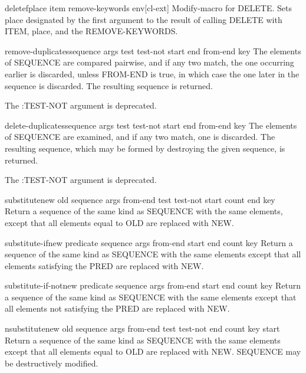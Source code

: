 \documentclass[10pt,english]{book}
\begin{document}
\begin{macro}{deletef}{place item \rest remove-keywords \env env}[cl-ext]
  Modify-macro for DELETE. Sets place designated by the first argument
  to the result of calling DELETE with ITEM, place, and the
  REMOVE-KEYWORDS.
\end{macro}

\begin{function}{remove-duplicates}{sequence \rest args \key test test-not start end from-end key}
  The elements of SEQUENCE are compared pairwise, and if any two match,
  the one occurring earlier is discarded, unless FROM-END is true, in
  which case the one later in the sequence is discarded. The resulting
  sequence is returned.

  The :TEST-NOT argument is deprecated.
\end{function}

\begin{function}{delete-duplicates}{sequence \rest args \key test test-not start end from-end key}
  The elements of SEQUENCE are examined, and if any two match, one is
  discarded. The resulting sequence, which may be formed by destroying the
  given sequence, is returned.

  The :TEST-NOT argument is deprecated.
\end{function}

\begin{function}{substitute}{new old sequence \rest args \key from-end test test-not start count end key}
  Return a sequence of the same kind as SEQUENCE with the same elements,
  except that all elements equal to OLD are replaced with NEW.
\end{function}

\begin{function}{substitute-if}{new predicate sequence \rest args \key from-end start end count key}
  Return a sequence of the same kind as SEQUENCE with the same elements
  except that all elements satisfying the PRED are replaced with NEW.
\end{function}

\begin{function}{substitute-if-not}{new predicate sequence \rest args \key from-end start end count key}
  Return a sequence of the same kind as SEQUENCE with the same elements
  except that all elements not satisfying the PRED are replaced with NEW.
\end{function}

\begin{function}{nsubstitute}{new old sequence \rest args \key from-end test test-not end count key start}
  Return a sequence of the same kind as SEQUENCE with the same elements
  except that all elements equal to OLD are replaced with NEW. SEQUENCE
  may be destructively modified.
\end{function}
\end{document}
